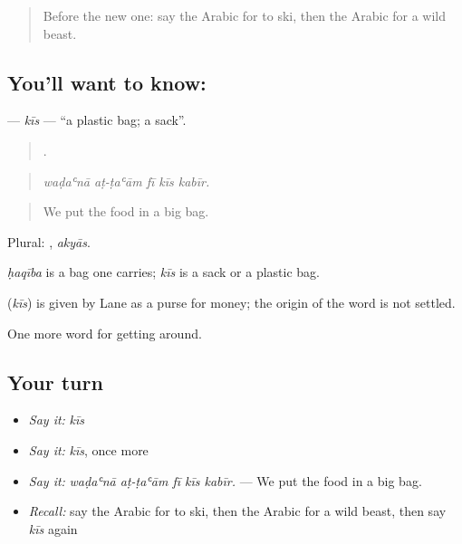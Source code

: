 \label{lesson:AR-C479-kis}



\begin{quote}
Before the new one: say the Arabic for to ski, then the Arabic for a wild beast.
\end{quote}

\subsection*{You'll want to know: }
\textbf{} — \emph{kīs} — \textquotedblleft{}a plastic bag; a sack\textquotedblright{}.

\begin{quote}
    .
\end{quote}

\begin{quote}
\emph{waḍaʿnā aṭ-ṭaʿām fī kīs kabīr.}
\end{quote}

\begin{quote}
We put the food in a big bag.
\end{quote}

Plural: , \emph{akyās}.

\emph{ḥaqība} is a bag one carries; \emph{kīs} is a sack or a plastic bag.

\begin{cousinweb}
\textbf{} (\emph{kīs}) is given by Lane as a purse for money; the origin of the word is not settled.
\end{cousinweb}

\begin{grammarlens}[title={What you've built}]
One more word for getting around.
\end{grammarlens}

\subsection*{Your turn}
\begin{itemize}
\raggedright
  \item \emph{Say it:} \emph{kīs}
  \item \emph{Say it:} \emph{kīs}, once more
  \item \emph{Say it:} \emph{waḍaʿnā aṭ-ṭaʿām fī kīs kabīr.} — We put the food in a big bag.
  \item \emph{Recall:} say the Arabic for to ski, then the Arabic for a wild beast, then say \emph{kīs} again
\end{itemize}

